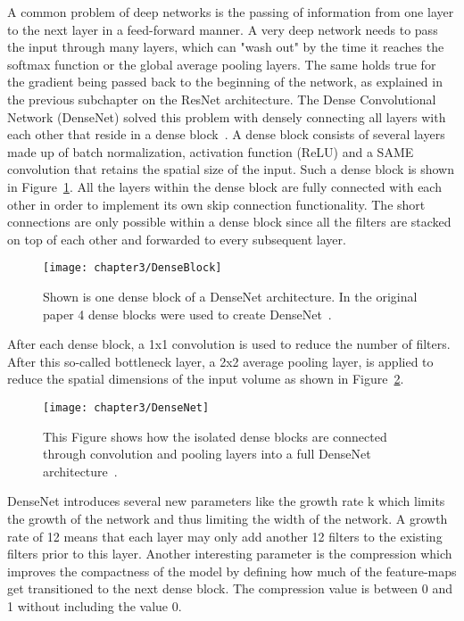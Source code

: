 A common problem of deep networks is the passing of information from one layer to the next layer in a feed-forward manner. A very deep network needs to pass the input through many layers, which can "wash out" by the time it reaches the softmax function or the global average pooling layers. The same holds true for the gradient being passed back to the beginning of the network, as explained in the previous subchapter on the ResNet architecture. The Dense Convolutional Network (DenseNet) solved this problem with densely connecting all layers with each other that reside in a dense block~\cite{huang2017densely}. A dense block
consists of several layers made up of batch normalization, activation function (ReLU) and a SAME convolution that retains the spatial size of the input. Such a dense block is shown in Figure~\ref{fig:DenseBlock}. All the layers within the dense block are fully connected with each other in order to implement its own skip connection functionality. The short connections are only possible within a dense block since all the filters are stacked on top of each other and forwarded to every subsequent layer.\\


\begin{figure}[!h]
  \centering
  \caption{Shown is one dense block of a DenseNet architecture. In the original paper 4 dense blocks were used to create DenseNet~\cite{huang2017densely}.}
  \texttt{[image: chapter3/DenseBlock]}
  \label{fig:DenseBlock}
\end{figure}

\quad

After each dense block, a 1x1 convolution is used to reduce the number of filters. After this so-called bottleneck layer, a 2x2 average pooling layer, is applied to reduce the spatial dimensions of the input volume as shown in Figure~\ref{fig:DenseNet}.\\


\begin{figure}[!h]
  \centering
  \caption{This Figure shows how the isolated dense blocks are connected through convolution and pooling layers into a full DenseNet architecture~\cite{huang2017densely}.}
  \texttt{[image: chapter3/DenseNet]}
  \label{fig:DenseNet}
\end{figure}

\quad

DenseNet introduces several new parameters like the growth rate k which limits the growth of the network and thus limiting the width of the network. A growth rate of 12 means that each layer may only add another 12 filters to the existing filters prior to this layer. Another interesting parameter is the compression which improves the compactness of the model by defining how much of the feature-maps get transitioned to the next dense block. The compression value is between 0 and 1 without including the value 0.\\


